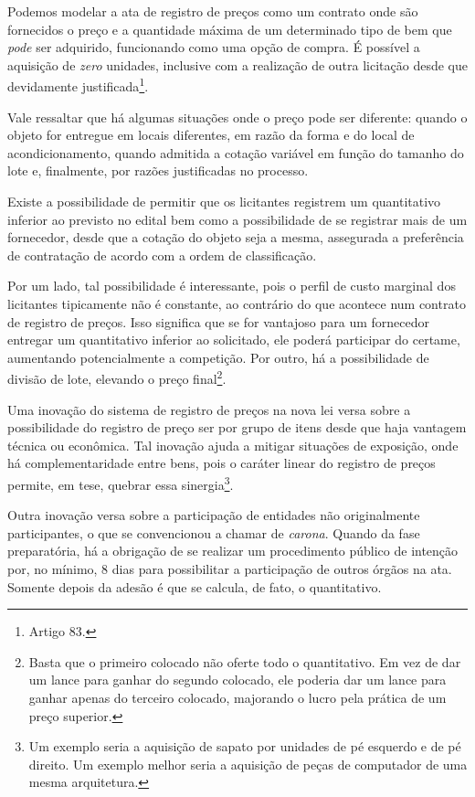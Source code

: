Podemos modelar a ata de registro de preços como um contrato onde são fornecidos o preço e a quantidade máxima de um determinado tipo de bem que \emph{pode} ser adquirido, funcionando como uma opção de compra. É possível a aquisição de \emph{zero} unidades, inclusive com a realização de outra licitação desde que devidamente justificada\footnote{Artigo 83.}.

Vale ressaltar que há algumas situações onde o preço pode ser diferente: quando o objeto for entregue em locais diferentes, em razão da forma e do local de acondicionamento, quando admitida a cotação variável em função do tamanho do lote e, finalmente, por razões justificadas no processo.

Existe a possibilidade de permitir que os licitantes registrem um quantitativo inferior ao previsto no edital bem como a possibilidade de se registrar mais de um fornecedor, desde que a cotação do objeto seja a mesma, assegurada a preferência de contratação de acordo com a ordem de classificação.

Por um lado, tal possibilidade é interessante, pois o perfil de custo marginal dos licitantes tipicamente não é constante, ao contrário do que acontece num contrato de registro de preços. Isso significa que se for vantajoso para um fornecedor entregar um quantitativo inferior ao solicitado, ele poderá participar do certame, aumentando potencialmente a competição. Por outro, há a possibilidade de divisão de lote, elevando o preço final\footnote{Basta que o primeiro colocado não oferte todo o quantitativo. Em vez de dar um lance para ganhar do segundo colocado, ele poderia dar um lance para ganhar apenas do terceiro colocado, majorando o lucro pela prática de um preço superior.}.

Uma inovação do sistema de registro de preços na nova lei versa sobre a possibilidade do registro de preço ser por grupo de itens desde que haja vantagem técnica ou econômica. Tal inovação ajuda a mitigar situações de exposição, onde há complementaridade entre bens, pois o caráter linear do registro de preços permite, em tese, quebrar essa sinergia\footnote{Um exemplo seria a aquisição de sapato por unidades de pé esquerdo e de pé direito. Um exemplo melhor seria a aquisição de peças de computador de uma mesma arquitetura.}.

Outra inovação versa sobre a participação de entidades não originalmente participantes, o que se convencionou a chamar de \emph{carona}. Quando da fase preparatória, há a obrigação de se realizar um procedimento público de intenção por, no mínimo, 8 dias para possibilitar a participação de outros órgãos na ata. Somente depois da adesão é que se calcula, de fato, o quantitativo.

